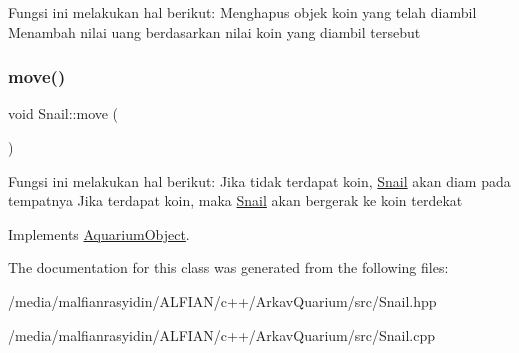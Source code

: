 Fungsi ini melakukan hal berikut\+: Menghapus objek koin yang telah diambil Menambah nilai uang berdasarkan nilai koin yang diambil tersebut \mbox{\label{class_snail_af5892ec122d9199480c813b74488256b}} 
\subsubsection{\texorpdfstring{move()}{move()}}
{\footnotesize\ttfamily void Snail\+::move (\begin{DoxyParamCaption}{ }\end{DoxyParamCaption})\hspace{0.3cm}{\ttfamily [virtual]}}

Fungsi ini melakukan hal berikut\+: Jika tidak terdapat koin, \mbox{\hyperlink{class_snail}{Snail}} akan diam pada tempatnya Jika terdapat koin, maka \mbox{\hyperlink{class_snail}{Snail}} akan bergerak ke koin terdekat 

Implements \mbox{\hyperlink{class_aquarium_object_a42c4de640f89ac8aebc26b7618578575}{Aquarium\+Object}}.



The documentation for this class was generated from the following files\+:\begin{DoxyCompactItemize}
\item 
/media/malfianrasyidin/\+A\+L\+F\+I\+A\+N/c++/\+Arkav\+Quarium/src/Snail.\+hpp\item 
/media/malfianrasyidin/\+A\+L\+F\+I\+A\+N/c++/\+Arkav\+Quarium/src/Snail.\+cpp\end{DoxyCompactItemize}
